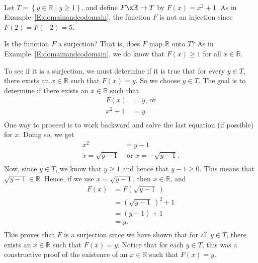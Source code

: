 \begin{example}\label{E:domainandcodomain2} \hfill \\
Let  $T = \left\{ y \in \mathbb{R} \mid y \geq 1 \right\}$, and define  $F\x \mathbb{R} \to T$  by 
 $F( x ) = x^2  + 1$.
As in Example~\ref{E:domainandcodomain}, the function  $F$  is not an injection since  
$F( 2 ) = F( { - 2} ) = 5$.

Is the function  $F$ a surjection?  That is, does  $F$  map $\mathbb{R}$ onto  $T$?   As in Example~\ref{E:domainandcodomain}, we do know that  $F( x ) \geq 1$ for all 
$x \in \mathbb{R}$.  

To see if it is a surjection, we must determine if it is true that for every $y \in T$, there exists an $x \in \mathbb{R}$ such that $F ( x ) = y$.  So we choose  $y \in T$\!.  The goal is to determine if  there exists an $x \in \mathbb{R}$ such that
\[
\begin{aligned}
  F( x ) &= y \text{, or} \\ 
           x^2  + 1 &= y. \\ 
\end{aligned} 
\]
One way to proceed is to work backward and  solve the last equation (if possible) for  $x$.  Doing so, we get
\[
\begin{aligned}
  x^2  &= y - 1 \\ 
  x = \sqrt {y - 1} &\text{   or   }x =  - \sqrt {y - 1}.  \\ 
\end{aligned} 
\]
Now,  since  $y \in T$, we know that  $y \geq 1$  and hence that  $y - 1 \geq 0$.  This means that  $\sqrt {y - 1}  \in \mathbb{R}$.  Hence, if we use  $x = \sqrt {y - 1} $, then  $x \in \mathbb{R}$, and
\[
\begin{aligned}
  F( x ) &= F\left( {\sqrt {y - 1} } \:\right) \\ 
                    &= \left( {\sqrt {y - 1} } \: \right)^2  + 1 \\ 
                    &= ( {y - 1} ) + 1 \\ 
                    &= y. \\ 
\end{aligned}
\]
This proves that  $F$  is a surjection since we have shown that for all  $y \in T$\!, there exists an  $x \in \mathbb{R}$  such that  $F( x ) = y$.  Notice that for each $y \in T$\!, this was a constructive proof of the existence of an $x \in \mathbb{R}$ such that $F ( x ) = y$.
\end{example}

